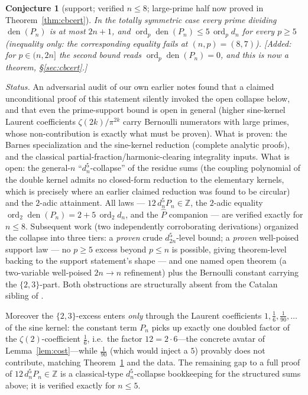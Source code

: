 \documentclass[11pt]{article}
\newtheorem{conjecture}[theorem]{Conjecture}
\theoremstyle{definition}
\newcommand{\dn}[1]{d_{#1}}
\newcommand{\ord}{\operatorname{ord}}
\newcommand{\den}{\operatorname{den}}
\newcommand{\Z}{\mathbb{Z}}
\begin{document}
\begin{conjecture}[support; verified $n\le8$; large-prime half now
proved in Theorem~\ref{thm:cbcert}]\label{thm:support}
In the totally symmetric case every prime dividing $\den(P_n)$ is at
most $2n+1$, and $\ord_p\den(P_n)\le 5\,\ord_p \dn{n}$ for every
$p\ge5$ (inequality only: the corresponding equality fails at
$(n,p)=(8,7)$). \textup{[Added:} for $p\in(n,2n]$ the second bound
reads $\ord_p\den(P_n)=0$, and this is now a theorem, \S\ref{sec:cbcert}.\textup{]}
\end{conjecture}

\noindent\emph{Status.} An adversarial audit of our own earlier notes
found that a claimed unconditional proof of this statement silently
invoked the open collapse below, and that even the prime-support bound
is open in general (higher sine-kernel Laurent coefficients
$\zeta(2k)/\pi^{2k}$ carry Bernoulli numerators with large primes,
whose non-contribution is exactly what must be proven). What is proven:
the Barnes specialization and the sine-kernel reduction (complete
analytic proofs), and the classical partial-fraction/harmonic-clearing
integrality inputs. What is open: the general-$n$ ``$\dn{n}^5$-collapse''
of the residue sums (the coupling polynomial of the double kernel admits
no closed-form reduction to the elementary kernels, which is precisely
where an earlier claimed reduction was found to be circular) and the
$2$-adic attainment. All laws --- $12\,\dn{n}^5P_n\in\Z$, the
$2$-adic equality $\ord_2\den(P_n)=2+5\,\ord_2\dn{n}$, and the
$\hat P$ companion --- are verified exactly for $n\le8$.
Subsequent work (two independently corroborating derivations) organized
the collapse into three tiers: a \emph{proven} crude $d_{2n}^5$-level
bound; a \emph{proven} well-poised support law --- no $p\ge5$ excess
beyond $p\le n$ is possible, giving theorem-level backing to the
support statement's shape --- and one named open theorem (a
two-variable well-poised $2n\to n$ refinement) plus the Bernoulli
constant carrying the $\{2,3\}$-part. Both obstructions are
structurally absent from the Catalan sibling of \cite{EMN}.

Moreover the $\{2,3\}$-excess enters \emph{only} through the Laurent
coefficients $1,\tfrac16,\tfrac1{90},\dots$ of the sine kernel: the
constant term $P_n$ picks up exactly one doubled factor of the
$\zeta(2)$-coefficient $\tfrac16$, i.e.\ the factor
$12=2\cdot 6$---the concrete avatar of Lemma~\ref{lem:cost}---while
$\tfrac1{90}$ (which would inject a $5$) provably does not contribute,
matching Theorem~\ref{thm:support} and the data. The remaining gap to a
full proof of $12\,\dn{n}^5P_n\in\Z$ is a classical-type
$\dn{n}^5$-collapse bookkeeping for the structured sums above; it is
verified exactly for $n\le5$.
\end{document}
